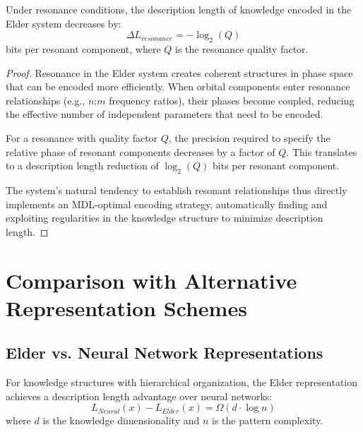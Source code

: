 \begin{theorem}
Under resonance conditions, the description length of knowledge encoded in the Elder system decreases by:
\begin{equation}
\Delta L_{resonance} = -\log_2(Q)
\end{equation}
bits per resonant component, where $Q$ is the resonance quality factor.
\end{theorem}

\begin{proof}
Resonance in the Elder system creates coherent structures in phase space that can be encoded more efficiently. When orbital components enter resonance relationships (e.g., $n$:$m$ frequency ratios), their phases become coupled, reducing the effective number of independent parameters that need to be encoded.

For a resonance with quality factor $Q$, the precision required to specify the relative phase of resonant components decreases by a factor of $Q$. This translates to a description length reduction of $\log_2(Q)$ bits per resonant component.

The system's natural tendency to establish resonant relationships thus directly implements an MDL-optimal encoding strategy, automatically finding and exploiting regularities in the knowledge structure to minimize description length.
\end{proof}

\section{Comparison with Alternative Representation Schemes}

\subsection{Elder vs. Neural Network Representations}

\begin{theorem}
For knowledge structures with hierarchical organization, the Elder representation achieves a description length advantage over neural networks:
\begin{equation}
L_{Neural}(x) - L_{Elder}(x) = \Omega(d \cdot \log n)
\end{equation}
where $d$ is the knowledge dimensionality and $n$ is the pattern complexity.
\end{theorem}

